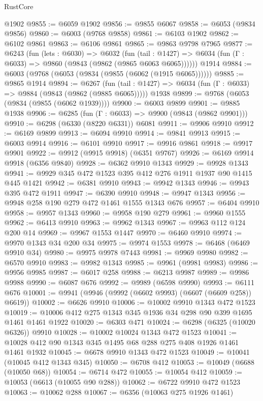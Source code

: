 \begin{lexlean}{RustCore}
\begin{coremodule}
{\begin{coremodule}
{{{{{{{{{{{{{{{{{{{{{{{{{{{{{{{{{{{{{{{{{{{{{{{    @1902
@9855 := @6059 @1902
@9856 := @9855 @6067
@9858 := @6053 (@9834 @9856)
@9860 := @6003 (@9768 @9858)
@9861 := @6103 @1902
@9862 := @6102 @9861
@9863 := @6106 @9861
@9865 := @9863 @9798 @7965
@9877 := @6243
    (fun (lets : @6030) =>
    @6032
      (fun (tail : @1427) => @6034 (fun (Γ : @6033) => @9860 (@9843 (@9862 (@9865 @6063 @6065))))))
    @1914
@9884 := @6003 (@9768 (@6053 (@9834 (@9855 (@6062 (@1915 @6065))))))
@9885 := @9865 @1914
@9894 := @6267
    (fun (tail : @1427) => @6034 (fun (Γ : @6033) => @9884 (@9843 (@9862 (@9885 @6065)))))
    @1938
@9899 := @9768 (@6053 (@9834 (@9855 (@6062 @1939))))
@9900 := @6003 @9899
@9901 := @9885 @1938
@9906 := @6285 (fun (Γ : @6033) => @9900 (@9843 (@9862 @9901)))
@9910 := @6298 (@6330 (@8220 @6331)) @6081
@9911 := @9906 @9910
@9912 := @6169 @9899
@9913 := @6094 @9910
@9914 := @9841 @9913
@9915 := @6003 @9914
@9916 := @6101 @9910
@9917 := @9916 @9861
@9918 := @9917 @9901
@9922 := @9912 (@9915 @9918) (@6351 @9767)
@9926 := @6169 @9914 @9918 (@6356 @9840)
@9928 := @6362 @9910 @1343
@9929 := @9928 @1343
@9941 := @9929 @345 @472 @1523 @395 @412 @276 @1911 @1937 @90 @1415 @445 @1421
@9942 := @6381 @9910
@9943 := @9942 @1343
@9946 := @9943 @395 @472 @1911
@9947 := @6390 @9910
@9948 := @9947 @1343
@9956 := @9948 @258 @190 @279 @472 @1461 @1555 @1343 @676
@9957 := @6404 @9910
@9958 := @9957 @1343
@9960 := @9958 @190 @279
@9961 := @9960 @1555
@9962 := @6413 @9910
@9963 := @9962 @1343
@9967 := @9963 @112 @124 @200 @14
@9969 := @9967 @1553 @1447
@9970 := @6460 @9910
@9974 := @9970 @1343 @34 @200 @34
@9975 := @9974 @1553
@9978 := @6468 (@6469 @9910 @34)
@9980 := @9975 @9978 @7443
@9981 := @9969 @9980
@9982 := @6570 @9910
@9983 := @9982 @1343
@9985 := @9961 (@9981 @9983)
@9986 := @9956 @9985
@9987 := @6017 @258
@9988 := @6213 @9987
@9989 := @9986 @9988
@9990 := @6087 @676
@9992 := @9989 (@6598 @9990)
@9993 := @6111 @676
@10001 := @9941 (@9946 (@9992 (@6602 @9993) (@6607 (@6609 @258)) @6619))
@10002 := @6626 @9910
@10006 := @10002 @9910 @1343 @472 @1523
@10019 := @10006 @412 @275 @1343 @345 @1936 @34 @298 @90 @399 @1695 @1461 @1461 @1922
@10020 := @6303 @471
@10024 := @6298 (@6325 (@10020 @6326)) @9910
@10028 := @10002 @10024 @1343 @472 @1523
@10041 := @10028 @412 @90 @1343 @345 @1495 @68 @288 @275 @408 @1926 @1461 @1461 @1932
@10045 := @6678 @9910 @1343 @472 @1523
@10049 := @10041 (@10045 @412 @1343 @345)
@10050 := @6708 @412
@10053 := @10049 (@6688 (@10050 @68))
@10054 := @6714 @472
@10055 := @10054 @412
@10059 := @10053 (@6613 (@10055 @90 @288))
@10062 := @6722 @9910 @472 @1523
@10063 := @10062 @288
@10067 := @6356 (@10063 @275 @1926 @1461)
}}}}}}}}}}}}}}}}}}}}}}}}}}}}}}}}}}}}}}}}}}}}}}}
\end{coremodule}}
\end{coremodule}
\end{lexlean}
